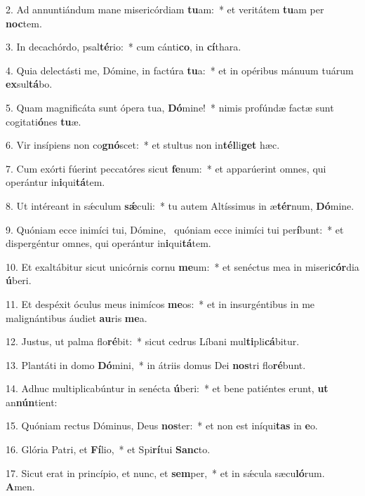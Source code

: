 2. Ad annuntiándum mane misericórdiam \textbf{tu}am:~*  et veritátem \textbf{tu}am per \textbf{noc}tem.\

3. In decachórdo, psal\textbf{té}rio:~*  cum cánti\textbf{co}, in \textbf{cí}thara.\

4. Quia delectásti me, Dómine, in factúra \textbf{tu}a:~*  et in opéribus mánuum tuárum \textbf{ex}sul\textbf{tá}bo.\

5. Quam magnificáta sunt ópera tua, \textbf{Dó}mine!~*  nimis profúndæ factæ sunt cogitati\textbf{ó}nes \textbf{tu}æ.\

6. Vir insípiens non co\textbf{gnó}scet:~*  et stultus non in\textbf{tél}li\textbf{get} hæc.\

7. Cum exórti fúerint peccatóres sicut \textbf{fe}num:~*  et apparúerint omnes, qui operántur in\textbf{i}qui\textbf{tá}tem.\

8. Ut intéreant in sǽculum \textbf{sǽ}culi:~*  tu autem Altíssimus in æ\textbf{tér}num, \textbf{Dó}mine.\

9. Quóniam ecce inimíci tui, Dómine, \dag\  quóniam ecce inimíci tui per\textbf{í}bunt:~*  et dispergéntur omnes, qui operántur in\textbf{i}qui\textbf{tá}tem.\

10. Et exaltábitur sicut unicórnis cornu \textbf{me}um:~*  et senéctus mea in miseri\textbf{cór}dia \textbf{ú}beri.\

11. Et despéxit óculus meus inimícos \textbf{me}os:~*  et in insurgéntibus in me malignántibus áudiet \textbf{au}ris \textbf{me}a.\

12. Justus, ut palma flo\textbf{ré}bit:~*  sicut cedrus Líbani mul\textbf{ti}pli\textbf{cá}bitur.\

13. Plantáti in domo \textbf{Dó}mini,~*  in átriis domus Dei \textbf{nos}tri flo\textbf{ré}bunt.\

14. Adhuc multiplicabúntur in senécta \textbf{ú}beri:~*  et bene patiéntes erunt, \textbf{ut} an\textbf{nún}tient:\

15. Quóniam rectus Dóminus, Deus \textbf{nos}ter:~*  et non est iníqui\textbf{tas} in \textbf{e}o.\

16. Glória Patri, et \textbf{Fí}lio,~*  et Spi\textbf{rí}tui \textbf{Sanc}to.\

17. Sicut erat in princípio, et nunc, et \textbf{sem}per,~*  et in sǽcula sæcu\textbf{ló}rum. \textbf{A}men.\

